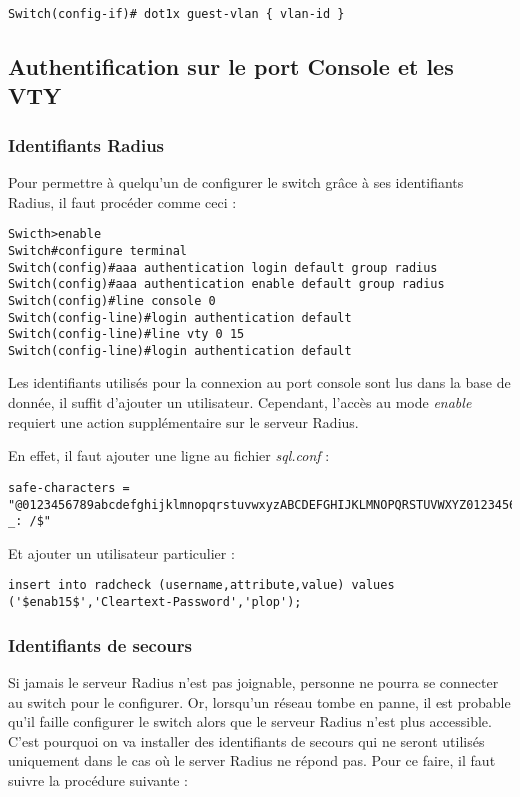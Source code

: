 \begin{verbatim}
Switch(config-if)# dot1x guest-vlan { vlan-id }
\end{verbatim}



\subsection{Authentification sur le port Console et les VTY}

\subsubsection{Identifiants Radius}

Pour permettre à quelqu'un de configurer le switch grâce à ses identifiants Radius, il faut procéder comme ceci :

\begin{verbatim}
Swicth>enable
Switch#configure terminal
Switch(config)#aaa authentication login default group radius
Switch(config)#aaa authentication enable default group radius
Switch(config)#line console 0
Switch(config-line)#login authentication default
Switch(config-line)#line vty 0 15
Switch(config-line)#login authentication default
\end{verbatim}

Les identifiants utilisés pour la connexion au port console sont lus dans la base de donnée, il suffit d'ajouter un utilisateur. Cependant, l'accès au mode \textit{enable} requiert une action supplémentaire sur le serveur Radius.

En effet, il faut ajouter une ligne au fichier \textit{sql.conf} :

\begin{verbatim}
safe-characters = "@0123456789abcdefghijklmnopqrstuvwxyzABCDEFGHIJKLMNOPQRSTUVWXYZ0123456789.-_: /$"
\end{verbatim}

Et ajouter un utilisateur particulier :

\begin{verbatim}
insert into radcheck (username,attribute,value) values ('$enab15$','Cleartext-Password','plop');
\end{verbatim}

\subsubsection{Identifiants de secours}

Si jamais le serveur Radius n'est pas joignable, personne ne pourra se connecter au switch pour le configurer. Or, lorsqu'un réseau tombe en panne, il est probable qu'il faille configurer le switch alors que le serveur Radius n'est plus accessible. C'est pourquoi on va installer des identifiants de secours qui ne seront utilisés uniquement dans le cas où le server Radius ne répond pas. Pour ce faire, il faut suivre la procédure suivante :


